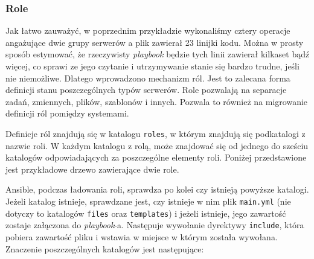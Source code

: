 \subsubsection{Role}
Jak łatwo zauważyć, w poprzednim przykładzie wykonaliśmy cztery operacje angażujące dwie grupy serwerów a plik zawierał 23 linijki kodu.
Można w prosty sposób estymować, że rzeczywisty \textit{playbook} będzie tych linii zawierał kilkaset bądź więcej, co sprawi ze jego czytanie i utrzymywanie stanie się bardzo trudne, jeśli nie niemożliwe.
Dlatego wprowadzono mechanizm ról.
Jest to zalecana forma definicji stanu poszczególnych typów serwerów.
Role pozwalają na separacje zadań, zmiennych, plików, szablonów i innych.
Pozwala to również na migrowanie definicji ról pomiędzy systemami.

Definicje ról znajdują się w katalogu \texttt{roles}, w którym znajdują się podkatalogi z nazwie roli.
W każdym katalogu z rolą, może znajdować się od jednego do sześciu katalogów odpowiadających za poszczególne elementy roli.
Poniżej przedstawione jest przykładowe drzewo zawierające dwie role.

Ansible, podczas ładowania roli, sprawdza po kolei czy istnieją powyższe katalogi.
Jeżeli katalog istnieje, sprawdzane jest, czy istnieje w nim plik \texttt{main.yml} (nie dotyczy to katalogów \texttt{files} oraz \texttt{templates}) i jeżeli istnieje, jego zawartość zostaje załączona do \textit{playbook}-a.
Następuje wywołanie dyrektywy \texttt{include}, która pobiera zawartość pliku i wstawia w miejsce w którym została wywołana.\\
Znaczenie poszczególnych katalogów jest następujące:
